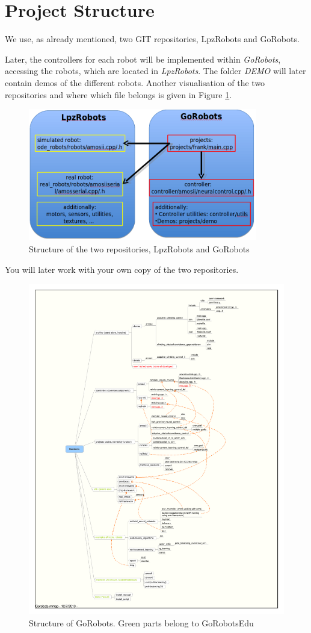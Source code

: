 \section{Project Structure}

We use, as already mentioned, two GIT repositories, LpzRobots and GoRobots.

Later, the controllers for each robot will be implemented within \emph{GoRobots}, accessing the robots, which are located in \emph{LpzRobots}. The folder \emph{DEMO} will later contain demos of the different robots.
Another visualisation of the two repositories and where which file belongs is given in Figure \ref{struc2}.
\begin{figure}[h!]
 \begin{center}
  \includegraphics[width=10cm]{./pics/struct.png}
 \end{center}
\caption{Structure of the two repositories, LpzRobots and GoRobots}
\label{struc2}
\end{figure}

You will later work with your own copy of the two repositories.

\newpage

\begin{figure}[h!]
 \begin{center}
  \includegraphics[width=14cm]{./pics/Gorobots.pdf}
 \end{center}
\caption{Structure of GoRobots. Green parts belong to GoRobotsEdu}
\label{struc3}
\end{figure}
